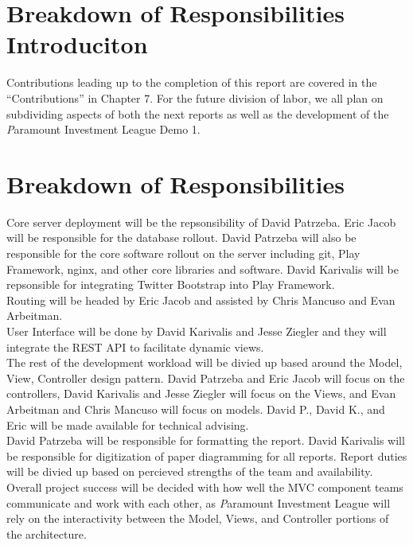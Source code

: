\newpage
\section{Breakdown of Responsibilities Introduciton}

Contributions leading up to the completion of this report are covered in the
``Contributions'' in Chapter 7. For the future division of labor, we all plan
on subdividing aspects of both the next reports as well as the development of
the {\textit Paramount Investment League} Demo 1.

\section{Breakdown of Responsibilities}

Core server deployment will be the repsonsibility of David Patrzeba.  Eric Jacob will
be responsible for the database rollout.  David Patrzeba will also be responsible for
the core software rollout on the server including git, Play Framework, nginx, and other
core libraries and software.  David Karivalis will be repsonsible for integrating
Twitter Bootstrap into Play Framework.\\

Routing will be headed by Eric Jacob and assisted by Chris Mancuso and Evan Arbeitman.\\

User Interface will be done by David Karivalis and Jesse Ziegler and they will integrate
the REST API\cite{wiki:restful} to facilitate dynamic views.\\

The rest of the development workload will be divied up based around the Model, View,
Controller design pattern.  David Patrzeba and Eric Jacob will focus on the controllers,
David Karivalis and Jesse Ziegler will focus on the Views, and Evan Arbeitman and Chris
Mancuso will focus on models.  David P., David K., and Eric will be made available
for technical advising.\\

David Patrzeba will be responsible for formatting the report. David Karivalis will be
responsible for digitization of paper diagramming for all reports.  Report duties will
be divied up based on percieved strengths of the team and availability.\\

Overall project success will be decided with how well the MVC\cite{wiki:mvc} component
teams communicate and work with each other, as {\textit Paramount Investment League}
will rely on the interactivity between the Model, Views, and Controller portions of
the architecture.\\

